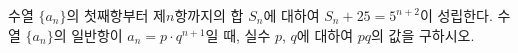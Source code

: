 수열 $\{a_n\}$의 첫째항부터 제$n$항까지의 합 $S_n$에 대하여 $S_n+25=5^{n+2}$이 성립한다. 수열 $\{a_n\}$의 일반항이 $a_n=p\cdot q^{n+1}$일 때, 실수 $p$, $q$에 대하여 $pq$의 값을 구하시오.
